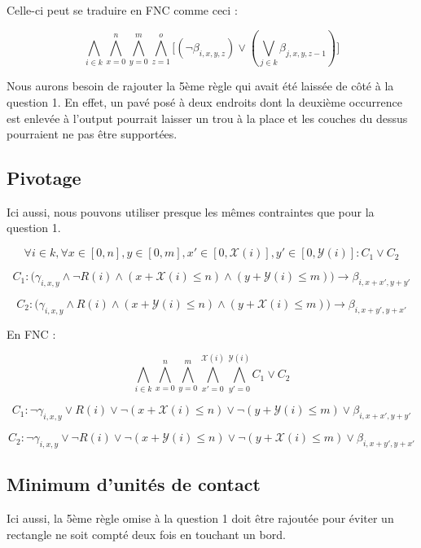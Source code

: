 \documentclass[a4paper]{article}
\begin{document}
Celle-ci peut se traduire en FNC comme ceci :

$$
\bigwedge_{i \in k}
  \bigwedge_{x=0}^{n} \bigwedge_{y=0}^{m} \bigwedge_{z=1}^{o}
  \Big[
  (\lnot \beta_{i, x, y, z}) \lor (\bigvee_{j \in k} \beta_{j, x, y, z-1})
  \Big]
$$

Nous aurons besoin de rajouter la 5ème règle qui avait été laissée de côté à la question 1. En effet, un pavé posé à deux endroits dont la deuxième occurrence est enlevée à l'output pourrait laisser un trou à la place et les couches du dessus pourraient ne pas être supportées.

\subsection{Pivotage}

Ici aussi, nous pouvons utiliser presque les mêmes contraintes que pour la question 1.

$$
\forall i \in k,
\forall x \in [0, n] , y \in [0, m],
x' \in [0, \mathcal{X}(i)], y' \in [0, \mathcal{Y}(i)] : C_1 \lor C_2
$$

$$
C_1 : \Big(
\gamma_{i, x, y} \land \lnot R(i)
\land (x + \mathcal{X}(i) \leq n)
\land (y + \mathcal{Y}(i) \leq m)
\Big)
\rightarrow \beta_{i, x + x', y + y'}
$$

$$
C_2 : \Big(
\gamma_{i, x, y} \land R(i)
\land (x + \mathcal{Y}(i) \leq n)
\land (y + \mathcal{X}(i) \leq m)
\Big)
\rightarrow \beta_{i, x + y', y + x'}
$$

En FNC :

$$
\bigwedge_{i \in k}
\bigwedge_{x=0}^{n} \bigwedge_{y=0}^{m}
\bigwedge_{x'=0}^{\mathcal{X}(i)} \bigwedge_{y'=0}^{\mathcal{Y}(i)} C_1 \lor C_2
$$

$$
C_1 :
\lnot \gamma_{i, x, y} \lor R(i)
\lor \lnot (x + \mathcal{X}(i) \leq n)
\lor \lnot (y + \mathcal{Y}(i) \leq m)
\lor \beta_{i, x + x', y + y'}
$$

$$
C_2 :
\lnot \gamma_{i, x, y} \lor \lnot R(i)
\lor \lnot (x + \mathcal{Y}(i) \leq n)
\lor \lnot (y + \mathcal{X}(i) \leq m)
\lor \beta_{i, x + y', y + x'}
$$


\subsection{Minimum d'unités de contact}

Ici aussi, la 5ème règle omise à la question 1 doit être rajoutée pour éviter un rectangle ne soit compté deux fois en touchant un bord.
\end{document}

